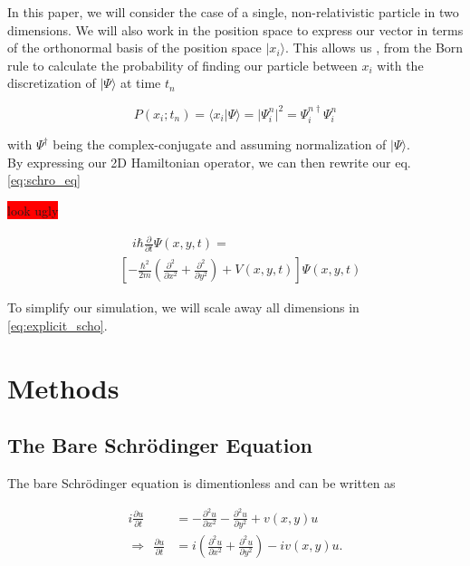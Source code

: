 \documentclass[english,notitlepage,reprint,nofootinbib]{revtex4-2}  %
\begin{document}
	In this paper, we will consider the case of a single, non-relativistic particle in two dimensions.
	We will also work in the position space to express our vector
	in terms of the orthonormal basis of the position space $|x_i\rangle$. This allows us
	, from the Born rule to calculate the probability of finding our particle between
	$x_i$ with the discretization of  $|\Psi\rangle$  at time $t_n$

	\begin{equation}
		P(x_i;t_n) = \langle x_i |\Psi\rangle = |\Psi^n_i|^2 =  \Psi^{n\dagger}_i\Psi^n_i
	\end{equation}

	with $\Psi^\dagger$ being the complex-conjugate and assuming normalization of $
	|\Psi\rangle$. \\

	By expressing our 2D Hamiltonian operator, we can then rewrite our eq. \ref{eq:schro_eq}


	\colorbox{red}{look ugly}

	\begin{align*}
		& \quad i \hbar \frac{\partial}{\partial t} \Psi(x, y, t)= \\
		& \left[-\frac{\hbar^{2}}{2 m}\left(\frac{\partial^{2}}{\partial x^{2}}+\frac{\partial^{2}}{\partial y^{2}}\right)+V(x, y, t)\right] \Psi(x, y, t) \tag{2} \label{eq:explicit_scho}
	\end{align*}


	To simplify our simulation, we will scale away all dimensions in \eqref{eq:explicit_scho}.
	
	\section{Methods}\label{sec:methods}
	\subsection{The Bare Schrödinger Equation}
	\noindent
	The bare Schrödinger equation is dimentionless and can be written as 

	\begin{equation}\label{eq:bare Schrodinger}
		\begin{split}
		i \frac{\partial u}{\partial t} &= -\frac{\partial^2 u}{\partial x^2} - \frac{\partial^2 u}{\partial y^2} + v(x,y) u\\
		\Rightarrow \ \ \frac{\partial u}{\partial t} &= i\left(\frac{\partial^2 u}{\partial x^2} + \frac{\partial^2 u}{\partial y^2}\right) - iv(x,y) u.
		\end{split}
	\end{equation} 
	
\end{document}
